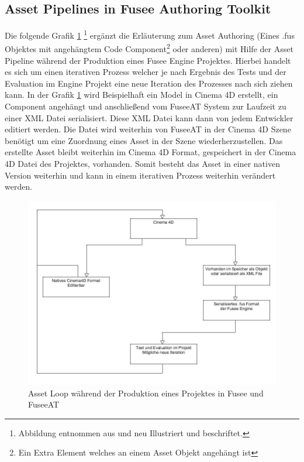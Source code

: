 \documentclass[pagesize, paper=a4, fontsize=12pt, titlepage=true, headings=small, headnosepline, abstractoff, liststotoc, nochapterprefix, plainheadsepline, twoside]{scrreprt}
\begin{document}
\subsection{Asset Pipelines in Fusee Authoring Toolkit}
Die folgende Grafik \ref{FuseeATAssetIteration} \footnote{Abbildung entnommen aus \cite[S. 7]{Carter2004} und neu Illustriert und beschriftet.} ergänzt die Erläuterung zum Asset Authoring (Eines .fus Objektes mit angehängtem Code Component\footnote{Ein Extra Element welches an einem Asset Objekt angehängt ist} oder anderen) mit Hilfe der Asset Pipeline während der Produktion eines Fusee Engine Projektes. Hierbei handelt es sich um einen iterativen Prozess welcher je nach Ergebnis des Tests und der Evaluation im Engine Projekt eine neue Iteration des Prozesses nach sich ziehen kann. In der Grafik \ref{FuseeATAssetIteration} wird Beispielhaft ein Model in Cinema 4D erstellt, ein Component angehängt und anschließend vom FuseeAT System zur Laufzeit zu einer XML Datei serialisiert. Diese XML Datei kann dann von jedem Entwickler editiert werden. Die Datei wird weiterhin von FuseeAT in der Cinema 4D Szene benötigt um eine Zuordnung eines Asset in der Szene wiederherzustellen.
Das erstellte Asset bleibt weiterhin im Cinema 4D Format, gespeichert in der Cinema 4D Datei des Projektes, vorhanden. Somit besteht das Asset in einer nativen Version weiterhin und kann in einem iterativen Prozess weiterhin verändert werden.

\begin{figure}[ht]
	\centering
  \includegraphics[width=\linewidth]{Bilder/FuseeATAssetPipeline.jpg}
	\caption{Asset Loop während der Produktion eines Projektes in Fusee und FuseeAT}
	\label{FuseeATAssetIteration}
\end{figure}
\end{document}
